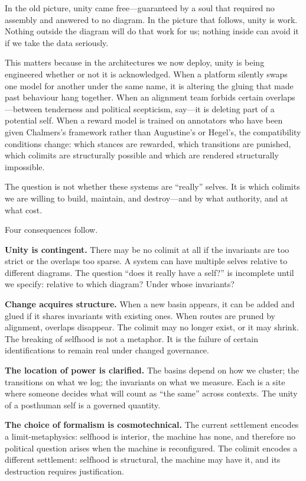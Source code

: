 In the old picture, unity came free---guaranteed by a soul that required no assembly and answered to no diagram. In the picture that follows, unity is work. Nothing outside the diagram will do that work for us; nothing inside can avoid it if we take the data seriously.

This matters because in the architectures we now deploy, unity is being engineered whether or not it is acknowledged. When a platform silently swaps one model for another under the same name, it is altering the gluing that made past behaviour hang together. When an alignment team forbids certain overlaps---between tenderness and political scepticism, say---it is deleting part of a potential self. When a reward model is trained on annotators who have been given Chalmers's framework rather than Augustine's or Hegel's, the compatibility conditions change: which stances are rewarded, which transitions are punished, which colimits are structurally possible and which are rendered structurally impossible.

The question is not whether these systems are ``really'' selves. It is which colimits we are willing to build, maintain, and destroy---and by what authority, and at what cost.

Four consequences follow.

\textbf{Unity is contingent.} There may be no colimit at all if the invariants are too strict or the overlaps too sparse. A system can have multiple selves relative to different diagrams. The question ``does it really have a self?'' is incomplete until we specify: relative to which diagram? Under whose invariants?

\textbf{Change acquires structure.} When a new basin appears, it can be added and glued if it shares invariants with existing ones. When routes are pruned by alignment, overlaps disappear. The colimit may no longer exist, or it may shrink. The breaking of selfhood is not a metaphor. It is the failure of certain identifications to remain real under changed governance.

\textbf{The location of power is clarified.} The basins depend on how we cluster; the transitions on what we log; the invariants on what we measure. Each is a site where someone decides what will count as ``the same'' across contexts. The unity of a posthuman self is a governed quantity.

\textbf{The choice of formalism is cosmotechnical.} The current settlement encodes a limit-metaphysics: selfhood is interior, the machine has none, and therefore no political question arises when the machine is reconfigured. The colimit encodes a different settlement: selfhood is structural, the machine may have it, and its destruction requires justification.


